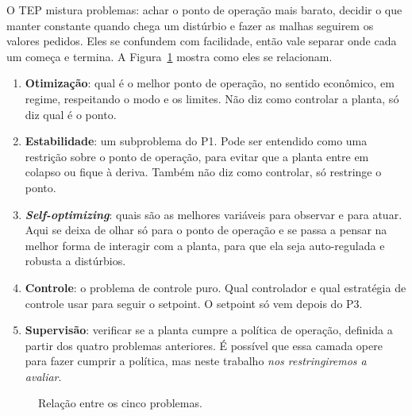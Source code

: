 O TEP mistura problemas: achar o ponto de operação mais barato, decidir o que manter constante quando chega um distúrbio e fazer as malhas seguirem os valores pedidos. Eles se confundem com facilidade, então vale separar onde cada um começa e termina. A Figura~\ref{fig:problemas} mostra como eles se relacionam.

\begin{enumerate}[label=\textbf{P\arabic*}]
	\item \textbf{Otimização}: qual é o melhor ponto de operação, no sentido econômico, em regime, respeitando o modo e os limites. Não diz como controlar a planta, só diz qual é o ponto.
	\item \textbf{Estabilidade}: um subproblema do P1. Pode ser entendido como uma restrição sobre o ponto de operação, para evitar que a planta entre em colapso ou fique à deriva. Também não diz como controlar, só restringe o ponto.
	\item \textbf{\textit{Self-optimizing}}: quais são as melhores variáveis para observar e para atuar. Aqui se deixa de olhar só para o ponto de operação e se passa a pensar na melhor forma de interagir com a planta, para que ela seja auto-regulada e robusta a distúrbios.
	\item \textbf{Controle}: o problema de controle puro. Qual controlador e qual estratégia de controle usar para seguir o setpoint. O setpoint só vem depois do P3.
	\item \textbf{Supervisão}: verificar se a planta cumpre a política de operação, definida a partir dos quatro problemas anteriores. É possível que essa camada opere para fazer cumprir a política, mas neste trabalho \textit{nos restringiremos a avaliar}.
\end{enumerate}

\begin{figure}[htbp]
\centering
{}
\caption{Relação entre os cinco problemas.}
\label{fig:problemas}
\end{figure}

